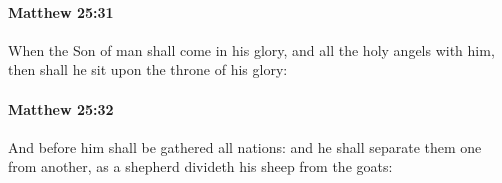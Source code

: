 		\paragraph{Matthew 25:31} %
			\label{MATTHEW-25-31}

			When the Son of man shall come in his glory, and all the holy angels with him, then shall he sit upon the throne of his glory:

			\begin{framed}
			\scriptsize
				\begin{compactdesc}
					\item[SBLG] 
				\end{compactdesc}
			\end{framed}

		\paragraph{Matthew 25:32} %
			\label{MATTHEW-25-32}

			And before him shall be gathered all nations: and he shall separate them one from another, as a shepherd divideth his sheep from the goats:

